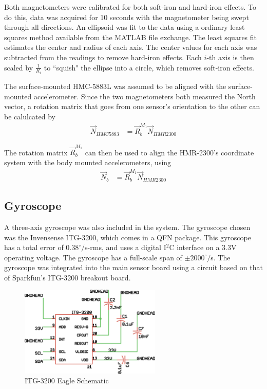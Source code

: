  Both magnetometers were calibrated for both soft-iron and hard-iron effects\cite{magCalibration}. To do this, data was acquired for 10 seconds with the magnetometer being swept through all directions. An ellipsoid was fit to the data using a ordinary least squares method available from the MATLAB file exchange\cite{ellipsoidFit}.
 The least squares fit estimates the center and radius of each axis. The center values for each axis was subtracted from the readings to remove hard-iron effects. Each $i$-th axis is then scaled by $\frac{1}{R_i}$ to ``squish" the ellipse into a circle, which removes soft-iron effects.
 
 The surface-mounted HMC-5883L was assumed to be aligned with the surface-mounted accelerometer. Since the two magnetometers both measured the North vector, a rotation matrix that goes from one sensor's orientation to the other can be calulcated by
 \begin{align}
\vec{N}_{HMC5883} &= \vec{R}^{M_1}_b\vec{N}_{HMR2300}
 \end{align}
 
 The rotation matrix $\vec{R}^{M_1}_b$ can then be used to align the HMR-2300's coordinate system with the body mounted accelerometers, using
 \begin{align}
\vec{N}_b &= \vec{R}^{M_1}_b\vec{N}_{HMR2300}
 \end{align}
 
\subsection*{Gyroscope}
A three-axis gyroscope was also included in the system. The gyroscope chosen was the Invensense ITG-3200, which comes in a QFN package. This gyroscope has a total error of $0.38^\circ/$s-rms\cite{itg3200DataSheet}, and uses a digital I$^2$C interface on a 3.3V operating voltage. The gyroscope has a full-scale span of $\pm2000^\circ/$s. The gyroscope was integrated into the main sensor board using a circuit based on that of Sparkfun's ITG-3200 breakout board\cite{itg3200BOBSchematic}.

\begin{figure}[H]

  \centering
    \includegraphics[width=0.6\textwidth]{figures/itg3200Schematic.eps}
      \caption{ITG-3200 Eagle Schematic} \label{itg3200Schematic}
\end{figure}

